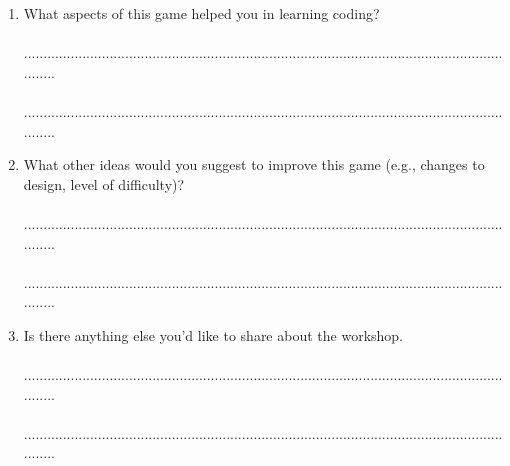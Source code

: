 \documentclass[12pt]{article}\pagestyle{myheadings}
\theoremstyle{plain}
\begin{document}
\begin{mdframed}
\begin{enumerate}

\item What aspects of this game helped you in learning coding?\\
\\...................................................................................................................................\\
\\...................................................................................................................................


\item What other ideas would you suggest to improve this game (e.g., changes to design, level of difficulty)?\\
\\...................................................................................................................................\\
\\...................................................................................................................................

\item Is there anything else you'd like to share about the workshop.\\
\\...................................................................................................................................\\
\\...................................................................................................................................

\end{enumerate}
\end{mdframed}
\end{document}
